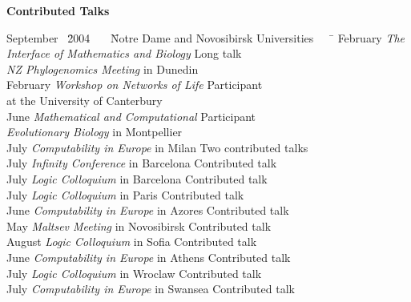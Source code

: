 \documentclass[12pt]{article}
\begin{document}
\centerline{\bf Contributed Talks}
\begin{tabbing}
September \ \=2004 \ \ \ \= Notre Dame and Novosibirsk Universities \ \ \ \= \kill
February                    \> {\em The Interface of Mathematics and Biology }                                      \> Long talk\\
                                        \>                \> {\em NZ Phylogenomics Meeting } in Dunedin  \> \\
February              \>  {\em Workshop on Networks of Life }                                     \> Participant \\
            \>              \>  at the University of Canterbury                                      \> \\
June                    \> {\em Mathematical and Computational }                                      \> Participant\\
                                        \>                \> {\em Evolutionary Biology } in Montpellier \> \\
July                    \> {\em Computability in Europe} in Milan                                       \> Two contributed talks\\
July                     \> {\em Infinity Conference} in Barcelona                                              \> Contributed talk\\
July                     \> {\em Logic Colloquium} in Barcelona                                              \> Contributed talk\\
July                     \> {\em Logic Colloquium} in Paris                                                     \> Contributed talk\\
June                    \> {\em Computability in Europe} in Azores                                       \> Contributed talk\\
May                     \> {\em Maltsev Meeting} in Novosibirsk                                             \> Contributed talk\\
August          \> {\em Logic Colloquium} in Sofia                                                      \> Contributed talk\\
June                  \> {\em Computability in Europe} in Athens                                         \> Contributed talk\\
July                    \> {\em Logic Colloquium} in Wroclaw                                               \> Contributed talk\\
July                    \> {\em Computability in Europe} in Swansea                                      \> Contributed talk\\
\end{tabbing}
\end{document}
